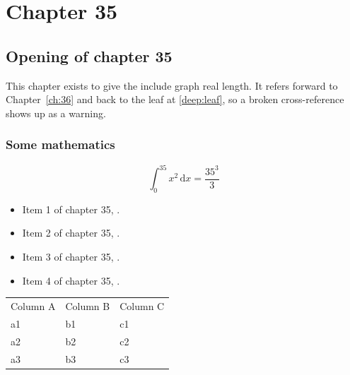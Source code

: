 \chapter{Chapter 35}
\label{ch:35}
\section{Opening of chapter 35}
This chapter exists to give the include graph real length. It refers
forward to Chapter~\ref{ch:36} and back to the leaf
at \ref{deep:leaf}, so a broken cross-reference shows up as a warning.

\subsection{Some mathematics}
\begin{equation}
  \int_0^{35} x^{2} \, \mathrm{d}x = \frac{35^{3}}{3}
\end{equation}

\begin{itemize}
  \item Item 1 of chapter 35, .
  \item Item 2 of chapter 35, .
  \item Item 3 of chapter 35, .
  \item Item 4 of chapter 35, .
\end{itemize}

\begin{tabular}{lll}
  Column A & Column B & Column C \\
  a1 & b1 & c1 \\
  a2 & b2 & c2 \\
  a3 & b3 & c3 \\
\end{tabular}
